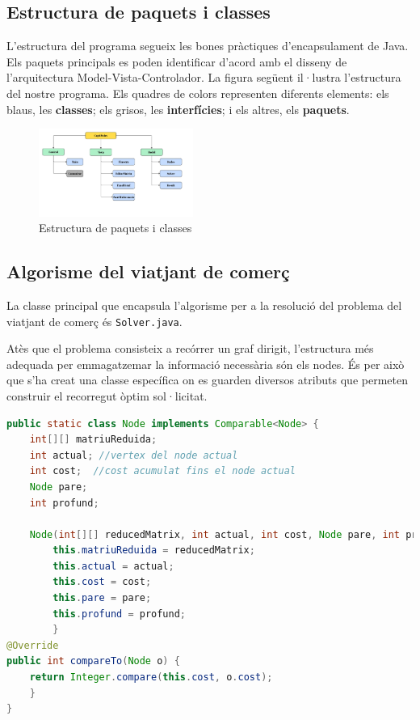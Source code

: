 \documentclass{ieeetj}
\begin{document}
\subsection{Estructura de paquets i classes}
L'estructura del programa segueix les bones pràctiques d'encapsulament de Java. 
Els paquets principals es poden identificar d'acord amb el disseny de l'arquitectura Model-Vista-Controlador. 
La figura següent il·lustra l'estructura del nostre programa. \newline
Els quadres de colors representen diferents elements: \textcolor{blau}{els blaus}, les \textbf{classes}; \textcolor{gris}{els grisos}, les \textbf{interfícies};\textcolor{verd}{ i els altres}, els \textbf{paquets}.

\begin{figure}[H]
    \centering
    \includegraphics[width=0.45\textwidth]{png/estructura.jpg}
    \caption{Estructura de paquets i classes }
    \label{fig:enter-label}
\end{figure}

\subsection{Algorisme del viatjant de comerç} 
La classe principal que encapsula l’algorisme per a la resolució del problema del viatjant de comerç és \texttt{Solver.java}.

Atès que el problema consisteix a recórrer un graf dirigit, l’estructura més adequada per emmagatzemar la informació necessària són els nodes. És per això que s’ha creat una classe específica on es guarden diversos atributs que permeten construir el recorregut òptim sol·licitat.

\begin{lstlisting}[language = JAVA, breaklines = true]
public static class Node implements Comparable<Node> {
    int[][] matriuReduida;
    int actual; //vertex del node actual
    int cost;  //cost acumulat fins el node actual
    Node pare;
    int profund;

    Node(int[][] reducedMatrix, int actual, int cost, Node pare, int profund)   {
        this.matriuReduida = reducedMatrix;
        this.actual = actual;
        this.cost = cost;
        this.pare = pare;
        this.profund = profund;
        }
@Override
public int compareTo(Node o) {
    return Integer.compare(this.cost, o.cost);
    }
}
\end{lstlisting}
\end{document}
